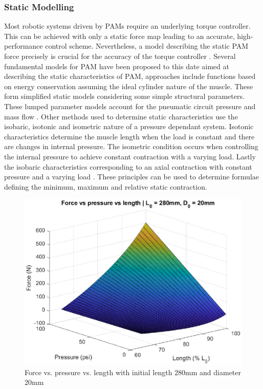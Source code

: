 \documentclass[11pt,a4paper]{article}
\begin{document}
\subsubsection{Static Modelling}
\label{sub:static_modelling}
Most robotic systems driven by PAMs require an underlying torque controller. This can be achieved with only a static force map leading to an accurate, high-performance control scheme. Nevertheless, a model describing the static PAM force precisely is crucial for the accuracy of the torque controller \cite{martens_boblan_2017}. Several fundamental models for PAM have been proposed to this date aimed at describing the static characteristics of PAM, approaches include functions based on energy conservation assuming the ideal cylinder nature of the muscle. These form simplified static models considering some simple structural parameters. These lumped parameter models account for the pneumatic circuit pressure and mass flow \cite{chou_hannaford_1996}. Other methods used to determine static characteristics use the isobaric, isotonic and isometric nature of a pressure dependant system. Isotonic characteristics determine the muscle length when the load is constant and there are changes in internal pressure. The isometric condition occurs when controlling the internal pressure to achieve constant contraction with a varying load. Lastly the isobaric characteristics corresponding to an axial contraction with constant pressure and a varying load \cite{takosoglu_laski_blasiak_bracha_pietrala_2016}. These principles can be used to determine formulae defining the minimum, maximum and relative static contraction. \newline

\begin{figure}[!hbt]
    \centering
    \includegraphics[scale=0.8]{staticmap.eps}
    \caption{Force vs. pressure vs. length with initial length 280mm and diameter 20mm}
    \label{fig:staticmap}
\end{figure}
\end{document}
